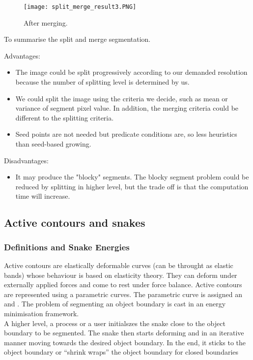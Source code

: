 \documentclass[a4paper]{article}
\begin{document}
\begin{figure}[H]
	\centering %
	\texttt{[image: split\_merge\_result3.PNG]}
    \caption{After merging.} 
\end{figure}
To summarise the split and merge segmentation.
\begin{multicols}{2}
Advantages:
\begin{itemize}
    \item[\textcolor{DarkPink}{\ding{51}}] The image could be split progressively according to our demanded resolution because the number of splitting level is determined by us.
    \item[\textcolor{DarkPink}{\ding{51}}]  We could split the image using the criteria we decide, such as mean or variance of segment pixel value. In addition, the merging criteria could be different to the splitting criteria. 
    \item[\textcolor{DarkPink}{\ding{51}}] Seed points are not needed but predicate conditions are, so less heuristics than seed-based growing.
\end{itemize}
\columnbreak
Disadvantages:
\begin{itemize}
    \item[\textcolor{DarkPink}{\ding{55}}]  It may produce the "blocky" segments. The blocky segment problem could be reduced by splitting in higher level, but the trade off is that the computation time will increase.
\end{itemize}
\end{multicols}






\subsection{Active contours and snakes} 


\subsubsection{Definitions and Snake Energies}
Active contours are elastically deformable curves (can be throught as elastic bands)
whose behaviour is based on elasticity theory. They can
deform under externally applied forces and come to
rest under force balance. Active contours are
represented using a parametric curves. 
The parametric curve is assigned an
 and .
The problem of segmenting an object
boundary is cast in an energy
minimisation framework.\\
A higher level, a process or a user initialszes the snake
close to the object boundary to be segmented.
The snake then starts deforming and in an iterative manner moving towards
the desired object boundary.
In the end, it sticks to the object boundary or “shrink
wraps” the object boundary for closed boundaries
\end{document}
